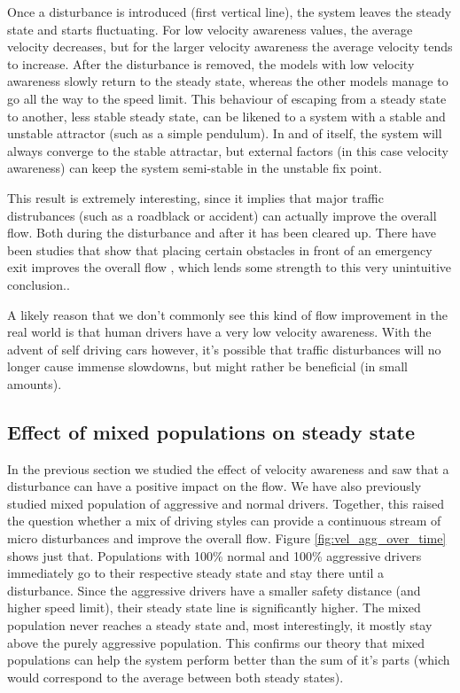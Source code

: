 \documentclass[11pt,a4paper,twocolumn]{article}
\begin{document}
Once a disturbance is introduced (first vertical line), the system leaves the steady state and starts fluctuating. For low velocity awareness values, the average velocity decreases, but for the larger velocity awareness the average velocity tends to increase.
After the disturbance is removed, the models with low velocity awareness slowly return to the steady state, whereas the other models manage to go all the way to the speed limit. This behaviour of escaping from a steady state to another, less stable steady state, can be likened to a system with a stable and unstable attractor (such as a simple pendulum). In and of itself, the system will always converge to the stable attractar, but external factors (in this case velocity awareness) can keep the system semi-stable in the unstable fix point.

This result is extremely interesting, since it implies that major traffic distrubances (such as a roadblack or accident) can actually improve the overall flow. Both during the disturbance and after it has been cleared up.
There have been studies that show that placing certain obstacles in front of an emergency exit improves the overall flow \cite{yanagisawa2009obstacle}, which lends some strength to this very unintuitive conclusion..

A likely reason that we don't commonly see this kind of flow improvement in the real world is that human drivers have a very low velocity awareness. With the advent of self driving cars however, it's possible that traffic disturbances  will no longer cause immense slowdowns, but might rather be beneficial (in small amounts).

\subsection{Effect of mixed populations on steady state}
In the previous section we studied the effect of velocity awareness and saw that a disturbance can have a positive impact on the flow. We have also previously studied mixed population of aggressive and normal drivers. Together, this raised the question whether a mix of driving styles can provide a continuous stream of micro disturbances and improve the overall flow. Figure \ref{fig:vel_agg_over_time} shows just that.
Populations with 100\% normal and 100\% aggressive drivers immediately go to their respective steady state and stay there until a disturbance. Since the aggressive drivers have a smaller safety distance (and higher speed limit), their steady state line is significantly higher. The mixed population never reaches a steady state and, most interestingly, it mostly stay above the purely aggressive population. This confirms our theory that mixed populations can help the system perform better than the sum of it's parts (which would correspond to the average between both steady states).
\end{document}
